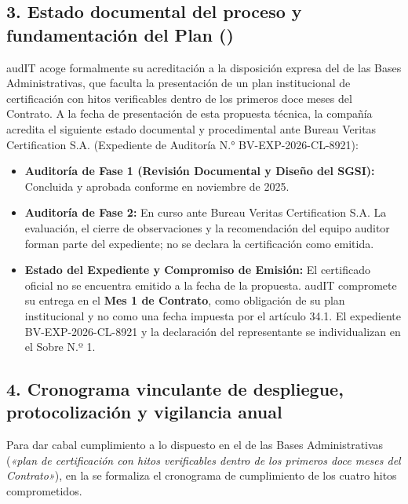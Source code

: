 \subsection*{3. Estado documental del proceso y fundamentación del Plan ()}
audIT acoge formalmente su acreditación a la disposición expresa del  de las Bases Administrativas, que faculta la presentación de un plan institucional de certificación con hitos verificables dentro de los primeros doce meses del Contrato. A la fecha de presentación de esta propuesta técnica, la compañía acredita el siguiente estado documental y procedimental ante Bureau Veritas Certification S.A. (Expediente de Auditoría N.° BV-EXP-2026-CL-8921):
\begin{itemize}
  \item \textbf{Auditoría de Fase 1 (Revisión Documental y Diseño del SGSI):} Concluida y aprobada conforme en noviembre de 2025.
  \item \textbf{Auditoría de Fase 2:} En curso ante Bureau Veritas Certification S.A. La evaluación, el cierre de observaciones y la recomendación del equipo auditor forman parte del expediente; no se declara la certificación como emitida.
  \item \textbf{Estado del Expediente y Compromiso de Emisión:} El certificado oficial no se encuentra emitido a la fecha de la propuesta. audIT compromete su entrega en el \textbf{Mes 1 de Contrato}, como obligación de su plan institucional y no como una fecha impuesta por el artículo 34.1. El expediente BV-EXP-2026-CL-8921 y la declaración del representante se individualizan en el Sobre N.º 1.
\end{itemize}

\subsection*{4. Cronograma vinculante de despliegue, protocolización y vigilancia anual}
Para dar cabal cumplimiento a lo dispuesto en el  de las Bases Administrativas (\textit{«plan de certificación con hitos verificables dentro de los primeros doce meses del Contrato»}), en la  se formaliza el cronograma de cumplimiento de los cuatro hitos comprometidos.

